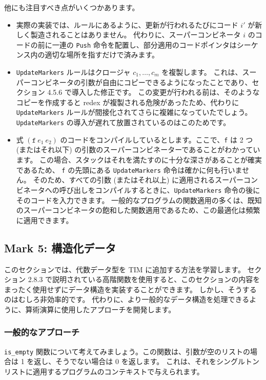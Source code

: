 \documentclass{jarticle}
\begin{document}
他にも注目すべき点がいくつかあります。

\begin{itemize}
	\item 実際の実装では、ルールにあるように、更新が行われるたびにコード $i'$ が新しく製造されることはありません。
	      代わりに、スーパーコンビネータ $i$ のコードの前に一連の \texttt{Push} 命令を配置し、部分適用のコードポインタはシーケンス内の適切な場所を指すだけで済みます。
	\item \texttt{UpdateMarkers} ルールはクロージャ $c_1, \ldots, c_m$ を複製します。
	      これは、スーパーコンビネータの引数が自由にコピーできるようになったことであり、セクション 4.5.6 で導入した修正です。
	      この変更が行われる前は、そのようなコピーを作成すると redex が複製される危険があったため、代わりに \texttt{UpdateMarkers} ルールが間接化されてさらに複雑になっていたでしょう。
	      \texttt{UpdateMarkers} の導入が遅れて放置されているのはこのためです。
	\item 式 $(\texttt{f} ~ e_1 ~ e_2)$ のコードをコンパイルしているとします。ここで、\texttt{f} は 2 つ (またはそれ以下) の引数のスーパーコンビネーターであることがわかっています。
	      この場合、スタックはそれを満たすのに十分な深さがあることが確実であるため、 \texttt{f} の先頭にある \texttt{UpdateMarkers} 命令は確かに何も行いません。
	      そのため、すべての引数 (またはそれ以上) に適用されるスーパーコンビネータへの呼び出しをコンパイルするときに、\texttt{UpdateMarkers} 命令の後にそのコードを入力できます。
	      一般的なプログラムの関数適用の多くは、既知のスーパーコンビネータの飽和した関数適用であるため、この最適化は頻繁に適用できます。
\end{itemize}
\newpage

\subsection{Mark 5: 構造化データ}

このセクションでは、代数データ型を TIM に追加する方法を学習します。
セクション 2.8.3 で説明されている高階関数を使用すると、このセクションの内容をまったく使用せずにデータ構造を実装することができます。
しかし、そうするのはむしろ非効率的です。
代わりに、より一般的なデータ構造を処理できるように、算術演算に使用したアプローチを開発します。

\subsubsection{一般的なアプローチ}

\texttt{is\_empty} 関数について考えてみましょう。この関数は、引数が空のリストの場合は 1 を返し、そうでない場合は 0 を返します。
これは、それをシングルトン リストに適用するプログラムのコンテキストで与えられます。
\end{document}
